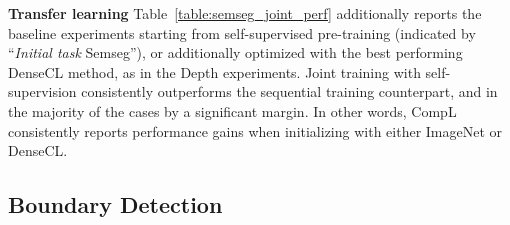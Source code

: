 \documentclass[10pt,twocolumn,letterpaper]{article}
\newcommand{\parsection}[1]{\vspace{1mm}\noindent\textbf{#1 }}
\begin{document}
\begin{table}[t!]
  \center
  \caption{Boundary detection performance in ODS F-score on the BSDS500 dataset. `' denote transfer learning methods, while `+' denotes joint training. Performance improvements are marginal, in contrast to the findings for other target tasks.}
  \vspace{-0.1in}
\label{table:edge_joint_perf}
\vspace{-0.2in}
\end{table}


\parsection{Transfer learning}
Table~\ref{table:semseg_joint_perf} additionally reports the baseline experiments starting from self-supervised pre-training (indicated by ``\emph{Initial task}  Semseg''), or additionally optimized with the best performing DenseCL method, as in the Depth experiments.
Joint training with self-supervision consistently outperforms the sequential training counterpart, and in the majority of the cases by a significant margin.
In other words, CompL consistently reports performance gains when initializing with either ImageNet or DenseCL.



\subsection{Boundary Detection}
\end{document}
